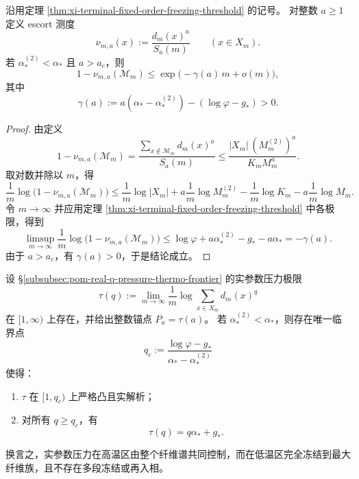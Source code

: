 \begin{corollary}\label{cor:xi-terminal-fixed-order-escort-maxfiber-concentration}
沿用定理 \ref{thm:xi-terminal-fixed-order-freezing-threshold} 的记号。
对整数 \(a\ge 1\) 定义 escort 测度
\[
\nu_{m,a}(x):=\frac{d_m(x)^a}{S_a(m)}\qquad(x\in X_m).
\]
若 \(\alpha_\ast^{(2)}<\alpha_\ast\) 且 \(a>a_c\)，则
\[
1-\nu_{m,a}(\mathcal M_m)\le \exp\!\bigl(-\gamma(a)\,m+o(m)\bigr),
\]
其中
\[
\gamma(a):=a(\alpha_\ast-\alpha_\ast^{(2)})-(\log\varphi-g_\ast)>0.
\]
\end{corollary}
\begin{proof}
由定义
\[
1-\nu_{m,a}(\mathcal M_m)
=
\frac{\sum_{x\notin\mathcal M_m}d_m(x)^a}{S_a(m)}
\le
\frac{|X_m|\,(M_m^{(2)})^a}{K_mM_m^a}.
\]
取对数并除以 \(m\)，得
\[
\frac{1}{m}\log\bigl(1-\nu_{m,a}(\mathcal M_m)\bigr)
\le
\frac{1}{m}\log|X_m|
+a\frac{1}{m}\log M_m^{(2)}
-\frac{1}{m}\log K_m
-a\frac{1}{m}\log M_m.
\]
令 \(m\to\infty\) 并应用定理 \ref{thm:xi-terminal-fixed-order-freezing-threshold} 中各极限，得到
\[
\limsup_{m\to\infty}\frac{1}{m}\log\bigl(1-\nu_{m,a}(\mathcal M_m)\bigr)
\le
\log\varphi+a\alpha_\ast^{(2)}-g_\ast-a\alpha_\ast
=-\gamma(a).
\]
由于 \(a>a_c\)，有 \(\gamma(a)>0\)，于是结论成立。
\end{proof}

\begin{conjecture}[冻结相的一段性]\label{conj:xi-terminal-single-transition-freezing-phase}
设 \S\ref{subsubsec:pom-real-q-pressure-thermo-frontier} 的实参数压力极限
\[
\tau(q):=\lim_{m\to\infty}\frac{1}{m}\log\sum_{x\in X_m}d_m(x)^q
\]
在 \([1,\infty)\) 上存在，并给出整数锚点 \(P_a=\tau(a)\)。
若 \(\alpha_\ast^{(2)}<\alpha_\ast\)，则存在唯一临界点
\[
q_c:=\frac{\log\varphi-g_\ast}{\alpha_\ast-\alpha_\ast^{(2)}}
\]
使得：
\begin{enumerate}
  \item \(\tau\) 在 \([1,q_c)\) 上严格凸且实解析；
  \item 对所有 \(q\ge q_c\)，有
  \[
  \tau(q)=q\alpha_\ast+g_\ast.
  \]
\end{enumerate}
换言之，实参数压力在高温区由整个纤维谱共同控制，而在低温区完全冻结到最大纤维族，且不存在多段冻结或再入相。
\end{conjecture}

